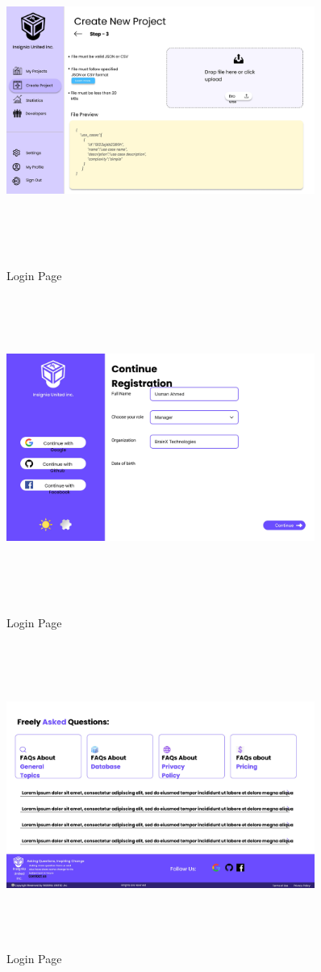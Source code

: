 \begin{figure}[H]
\pagebreak
\includegraphics[height=10cm, width=0.9\textwidth]{./images/prototype/0014}
\centering 
\caption{Login Page}
\label{fig:prototype1}

\includegraphics[height=10cm, width=0.9\textwidth]{./images/prototype/0015}
\centering 
\caption{Login Page}
\label{fig:prototype1}


\pagebreak
\includegraphics[height=10cm, width=0.9\textwidth]{./images/prototype/0016}
\centering 
\caption{Login Page}
\label{fig:prototype1}


\end{figure}

